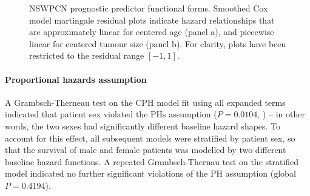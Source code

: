 \documentclass[dissertation.tex]{subfiles}
\begin{document}
\begin{figure}
\centering
\caption[Prognostic predictor functional forms]{\gls{NSWPCN} prognostic predictor functional forms. Smoothed Cox model martingale residual plots indicate hazard relationships that are approximately linear for centered age (panel a), and piecewise linear for centered tumour size (panel b).  For clarity, plots have been restricted to the residual range $[-1,1]$.}
\label{fig:nomo-funcform}
\end{figure}


\paragraph{Proportional hazards assumption}
A Grambsch-Therneau test \cite{Grambsch1994} on the \gls{CPH} model fit using all expanded terms indicated that patient sex violated the \glspl{PH} assumption ($P = 0.0104$, ) -- in other words, the two sexes had significantly different baseline hazard shapes.  To account for this effect, all subsequent models were stratified by patient sex, so that the survival of male and female patients was modelled by two different baseline hazard functions.  A repeated Grambsch-Thernau test on the stratified model indicated no further significant violations of the \gls{PH} assumption (global $P = 0.4194$).
\end{document}
